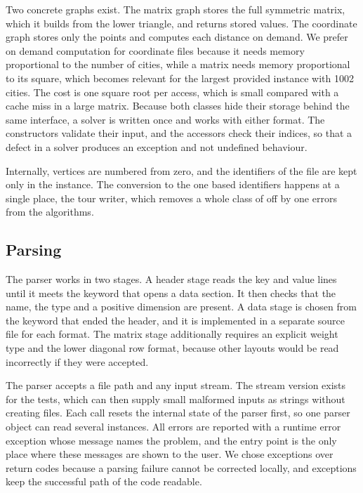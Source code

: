 \documentclass[11pt,a4paper]{article}
\begin{document}
Two concrete graphs exist. The matrix graph stores the full symmetric matrix, which it builds from the lower triangle, and returns stored values. The coordinate graph stores only the points and computes each distance on demand. We prefer on demand computation for coordinate files because it needs memory proportional to the number of cities, while a matrix needs memory proportional to its square, which becomes relevant for the largest provided instance with 1002 cities. The cost is one square root per access, which is small compared with a cache miss in a large matrix. Because both classes hide their storage behind the same interface, a solver is written once and works with either format. The constructors validate their input, and the accessors check their indices, so that a defect in a solver produces an exception and not undefined behaviour.

Internally, vertices are numbered from zero, and the identifiers of the file are kept only in the instance. The conversion to the one based identifiers happens at a single place, the tour writer, which removes a whole class of off by one errors from the algorithms.

\subsection{Parsing}

The parser works in two stages. A header stage reads the key and value lines until it meets the keyword that opens a data section. It then checks that the name, the type and a positive dimension are present. A data stage is chosen from the keyword that ended the header, and it is implemented in a separate source file for each format. The matrix stage additionally requires an explicit weight type and the lower diagonal row format, because other layouts would be read incorrectly if they were accepted.

The parser accepts a file path and any input stream. The stream version exists for the tests, which can then supply small malformed inputs as strings without creating files. Each call resets the internal state of the parser first, so one parser object can read several instances. All errors are reported with a runtime error exception whose message names the problem, and the entry point is the only place where these messages are shown to the user. We chose exceptions over return codes because a parsing failure cannot be corrected locally, and exceptions keep the successful path of the code readable.
\end{document}
